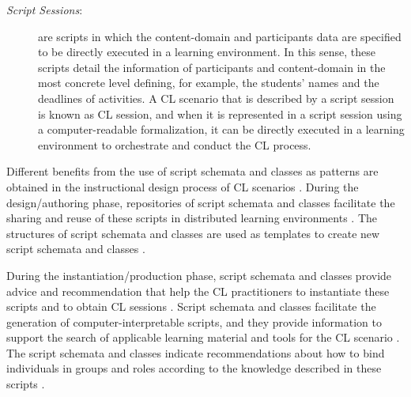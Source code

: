 \begin{description}
\item[\emph{Script Sessions}:] are scripts in which the content-domain and participants data are specified to be directly executed in a learning environment.
In this sense, these scripts detail the information of participants and content-domain in the most concrete level defining, for example, the students' names and the deadlines of activities.
A CL scenario that is described by a script session is known as CL session, and when it is represented in a script session using a computer-readable formalization, it can be directly executed in a learning environment to orchestrate and conduct the CL process.
\end{description}

Different benefits from the use of script schemata and classes as patterns are obtained in the instructional design process of CL scenarios \cite{AlharbiAthaudaChiong2014, ChallcoBittencourtIsotani2016, MiaoHoeksemaHoppeHarrer2005}. During the design/authoring phase, repositories of script schemata and classes facilitate the sharing and reuse of these scripts in distributed learning environments \cite{PrietoAsensio-PerezMunoz-CristobalDimitriadisJorrin-AbellanGomez-Sanchez2013, PrietoTchounikineAsensio-PerezSobreiraDimitriadis2014}.
The structures of script schemata and classes are used as templates to create new script schemata and classes \cite{AndreasHarrerUlrchHoppe2007, RonenKohen-Vacs2009}. 

During the instantiation/production phase, script schemata and classes provide advice and recommendation that help the CL practitioners to instantiate these scripts and to obtain CL sessions \cite{MagnisalisDemetriadis2012a, PrietoAsensio-PerezDimitriadisGomez-SanchezMunoz-Cristobal2011,Alario-HoyosBote-LorenzoGomez-SanchezAsensio-PerezVega-GorgojoRuiz-Calleja2013}.
Script schemata and classes facilitate the generation of computer-interpretable scripts, and they provide information to support the search of applicable learning material and tools for the CL scenario \cite{Bote-LorenzoVaquero-GonzalezVega-GorgojoDimitriadisAsensio-PerezGomez-SanchezHernandez-Leo2004, IsotaniMizoguchi2008a, Vega-GorgojoBote-LorenzoGomez-SanchezDimitriadisAsensio-Perez2005}.
The script schemata and classes indicate recommendations about how to bind individuals in groups and roles according to the knowledge described in these scripts \cite{IsotaniMizoguchiIsotaniCapeliIsotanideAlbuquerqueBittencourtJaques2013,Villasclaras-FernandezHernandez-GonzaloLeoAsensio-PerezDimitriadisMartinez-Mones2009}.

